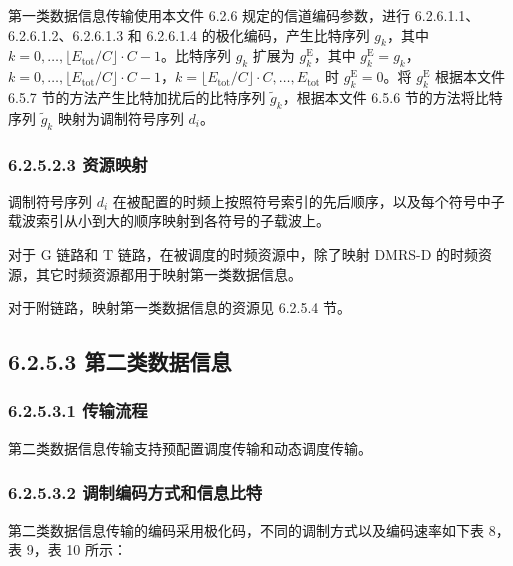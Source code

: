 \documentclass[11pt,a4paper]{ctexart}
\begin{document}
第一类数据信息传输使用本文件 6.2.6 规定的信道编码参数，进行 6.2.6.1.1、6.2.6.1.2、6.2.6.1.3 和 6.2.6.1.4 的极化编码，产生比特序列 $g_k$，其中 $k = 0, \ldots, \lfloor E_{\mathrm{tot}} / C \rfloor \cdot C - 1$。比特序列 $g_k$ 扩展为 $g^{\mathrm{E}}_k$，其中 $g^{\mathrm{E}}_k = g_k$，$k = 0, \ldots, \lfloor E_{\mathrm{tot}} / C \rfloor \cdot C - 1$，$k = \lfloor E_{\mathrm{tot}} / C \rfloor \cdot C, \ldots, E_{\mathrm{tot}}$ 时 $g^{\mathrm{E}}_k = 0$。将 $g^{\mathrm{E}}_k$ 根据本文件 6.5.7 节的方法产生比特加扰后的比特序列 $\tilde{g}_k$，根据本文件 6.5.6 节的方法将比特序列 $\tilde{g}_k$ 映射为调制符号序列 $d_i$。

\subsubsection{6.2.5.2.3 资源映射}

调制符号序列 $d_i$ 在被配置的时频上按照符号索引的先后顺序，以及每个符号中子载波索引从小到大的顺序映射到各符号的子载波上。

对于 G 链路和 T 链路，在被调度的时频资源中，除了映射 DMRS-D 的时频资源，其它时频资源都用于映射第一类数据信息。

对于附链路，映射第一类数据信息的资源见 6.2.5.4 节。

\subsection{6.2.5.3 第二类数据信息}

\subsubsection{6.2.5.3.1 传输流程}

第二类数据信息传输支持预配置调度传输和动态调度传输。

\subsubsection{6.2.5.3.2 调制编码方式和信息比特}

第二类数据信息传输的编码采用极化码，不同的调制方式以及编码速率如下表 8，表 9，表 10 所示：
\end{document}
